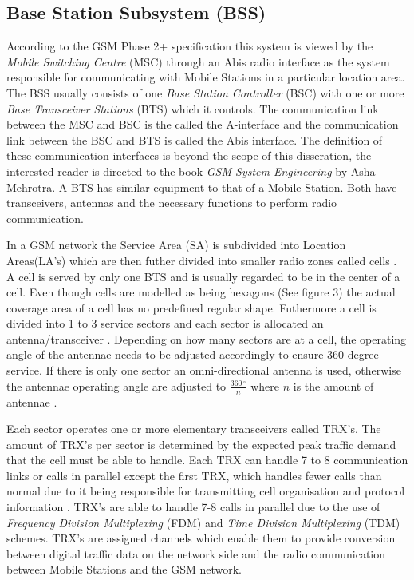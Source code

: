 \subsection{Base Station Subsystem (BSS)}

According to the GSM Phase 2+ specification this system is viewed by the \emph{Mobile Switching Centre} (MSC) through an Abis radio interface as the system responsible for communicating with Mobile Stations in a particular location area. The BSS usually consists of one \emph{Base Station Controller} (BSC) with one or more \emph{Base Transceiver Stations} (BTS) which it controls. The communication link between the MSC and BSC is the called the A-interface and the communication link between the BSC and BTS is called the Abis interface. The definition of these communication interfaces is beyond the scope of this disseration, the interested reader is directed to the book \emph{GSM System Engineering} by Asha Mehrotra. A BTS has similar equipment to that of a Mobile Station. Both have transceivers, antennas and the necessary functions to perform radio communication. 

In a GSM network the Service Area (SA) is subdivided into Location Areas(LA's) which are then futher divided into smaller radio zones called cells \cite{GSMSecurInTeleNetwork}. A cell is served by only one BTS and is usually regarded to be in the center of a cell. Even though cells are modelled as being hexagons (See figure 3) the actual coverage area of a cell has no predefined regular shape. Futhermore a cell is divided into 1 to 3 service sectors and each sector is allocated an antenna/transceiver \cite{GSMSysEngin}. Depending on how many sectors are at a cell, the operating angle of the antennae needs to be adjusted accordingly to ensure 360 degree service. If there is only one sector an omni-directional antenna is used, otherwise the antennae operating angle are adjusted to $\frac{360\,^{\circ}}{n}$ where ${n}$ is the amount of antennae \cite{Eisenblatter}.

Each sector operates one or more elementary transceivers called TRX’s. The amount of TRX’s per sector is determined by the expected peak traffic demand that the cell must be able to handle. Each TRX can handle 7 to 8 communication links or calls in parallel except the first TRX, which handles fewer calls than normal due to it being responsible for transmitting cell organisation and protocol information \cite{Eisenblatter}. TRX’s are able to handle 7-8 calls in parallel due to the use of \emph{Frequency Division Multiplexing} (FDM) and \emph{Time Division Multiplexing} (TDM) schemes. TRX’s are assigned channels which enable them to provide conversion between digital traffic data on the network side and the radio communication between Mobile Stations and 
the GSM network. \cite{ACOvsEA,FAPOrientationModel}

